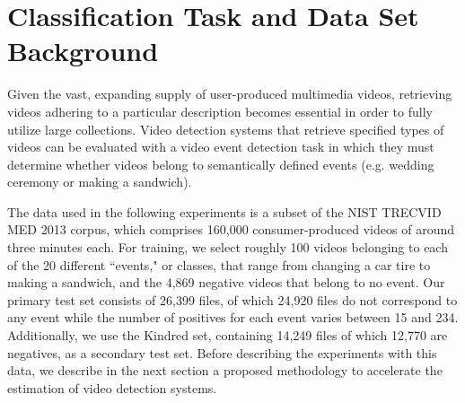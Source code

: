 \section{Classification Task and Data Set Background}
Given the vast, expanding supply of user-produced multimedia videos, retrieving videos adhering to a particular description becomes essential in order to fully utilize large collections. 
Video detection systems that retrieve specified types of videos can be evaluated with a video event detection task in which they must determine whether videos belong to semantically defined events (e.g. wedding ceremony or making a sandwich). 

The data used in the following experiments is a subset of the NIST TRECVID MED 2013 corpus, which comprises 160,000 consumer-produced videos of around three minutes each.
For training, we select roughly 100 videos belonging to each of the 20 different ``events," or classes, that range from changing a car tire to making a sandwich, and the 4,869 negative videos that belong to no event. 
Our primary test set consists of 26,399 files, of which 24,920 files do not correspond to any event while the number of positives for each event varies between 15 and 234. 
Additionally, we use the Kindred set, containing 14,249 files of which 12,770 are negatives, as a secondary test set. Before describing the experiments with this data, we describe in the next section a proposed methodology to accelerate the estimation of video detection systems.

